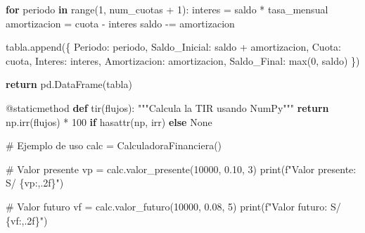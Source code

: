 \documentclass[
  doc,
  floatsintext,
  longtable,
  a4paper,
  nolmodern,
  notxfonts,
  notimes,
  12pt,
  colorlinks=true,linkcolor=blue,citecolor=blue,urlcolor=blue]{apa7}
\newenvironment{Shaded}{\begin{snugshade}}{\end{snugshade}}
\newcommand{\AttributeTok}[1]{\textcolor[rgb]{0.40,0.45,0.13}{#1}}
\newcommand{\BuiltInTok}[1]{\textcolor[rgb]{0.00,0.23,0.31}{#1}}
\newcommand{\CommentTok}[1]{\textcolor[rgb]{0.37,0.37,0.37}{#1}}
\newcommand{\ControlFlowTok}[1]{\textcolor[rgb]{0.00,0.23,0.31}{\textbf{#1}}}
\newcommand{\DecValTok}[1]{\textcolor[rgb]{0.68,0.00,0.00}{#1}}
\newcommand{\FloatTok}[1]{\textcolor[rgb]{0.68,0.00,0.00}{#1}}
\newcommand{\KeywordTok}[1]{\textcolor[rgb]{0.00,0.23,0.31}{\textbf{#1}}}
\newcommand{\NormalTok}[1]{\textcolor[rgb]{0.00,0.23,0.31}{#1}}
\newcommand{\OperatorTok}[1]{\textcolor[rgb]{0.37,0.37,0.37}{#1}}
\newcommand{\SpecialCharTok}[1]{\textcolor[rgb]{0.37,0.37,0.37}{#1}}
\newcommand{\SpecialStringTok}[1]{\textcolor[rgb]{0.13,0.47,0.30}{#1}}
\newcommand{\StringTok}[1]{\textcolor[rgb]{0.13,0.47,0.30}{#1}}
\newcommand{\VariableTok}[1]{\textcolor[rgb]{0.07,0.07,0.07}{#1}}
\begin{document}
\begin{Shaded}
\begin{Highlighting}[]
        \ControlFlowTok{for}\NormalTok{ periodo }\KeywordTok{in} \BuiltInTok{range}\NormalTok{(}\DecValTok{1}\NormalTok{, num\_cuotas }\OperatorTok{+} \DecValTok{1}\NormalTok{):}
\NormalTok{            interes }\OperatorTok{=}\NormalTok{ saldo }\OperatorTok{*}\NormalTok{ tasa\_mensual}
\NormalTok{            amortizacion }\OperatorTok{=}\NormalTok{ cuota }\OperatorTok{{-}}\NormalTok{ interes}
\NormalTok{            saldo }\OperatorTok{{-}=}\NormalTok{ amortizacion}
            
\NormalTok{            tabla.append(\{}
                \StringTok{\textquotesingle{}Periodo\textquotesingle{}}\NormalTok{: periodo,}
                \StringTok{\textquotesingle{}Saldo\_Inicial\textquotesingle{}}\NormalTok{: saldo }\OperatorTok{+}\NormalTok{ amortizacion,}
                \StringTok{\textquotesingle{}Cuota\textquotesingle{}}\NormalTok{: cuota,}
                \StringTok{\textquotesingle{}Interes\textquotesingle{}}\NormalTok{: interes,}
                \StringTok{\textquotesingle{}Amortizacion\textquotesingle{}}\NormalTok{: amortizacion,}
                \StringTok{\textquotesingle{}Saldo\_Final\textquotesingle{}}\NormalTok{: }\BuiltInTok{max}\NormalTok{(}\DecValTok{0}\NormalTok{, saldo)}
\NormalTok{            \})}
        
        \ControlFlowTok{return}\NormalTok{ pd.DataFrame(tabla)}
    
    \AttributeTok{@staticmethod}
    \KeywordTok{def}\NormalTok{ tir(flujos):}
        \CommentTok{"""Calcula la TIR usando NumPy"""}
        \ControlFlowTok{return}\NormalTok{ np.irr(flujos) }\OperatorTok{*} \DecValTok{100} \ControlFlowTok{if} \BuiltInTok{hasattr}\NormalTok{(np, }\StringTok{\textquotesingle{}irr\textquotesingle{}}\NormalTok{) }\ControlFlowTok{else} \VariableTok{None}

\CommentTok{\# Ejemplo de uso}
\NormalTok{calc }\OperatorTok{=}\NormalTok{ CalculadoraFinanciera()}

\CommentTok{\# Valor presente}
\NormalTok{vp }\OperatorTok{=}\NormalTok{ calc.valor\_presente(}\DecValTok{10000}\NormalTok{, }\FloatTok{0.10}\NormalTok{, }\DecValTok{3}\NormalTok{)}
\BuiltInTok{print}\NormalTok{(}\SpecialStringTok{f"Valor presente: S/ }\SpecialCharTok{\{}\NormalTok{vp}\SpecialCharTok{:,.2f\}}\SpecialStringTok{"}\NormalTok{)}

\CommentTok{\# Valor futuro}
\NormalTok{vf }\OperatorTok{=}\NormalTok{ calc.valor\_futuro(}\DecValTok{10000}\NormalTok{, }\FloatTok{0.08}\NormalTok{, }\DecValTok{5}\NormalTok{)}
\BuiltInTok{print}\NormalTok{(}\SpecialStringTok{f"Valor futuro: S/ }\SpecialCharTok{\{}\NormalTok{vf}\SpecialCharTok{:,.2f\}}\SpecialStringTok{"}\NormalTok{)}


\end{Highlighting}
\end{Shaded}
\end{document}
